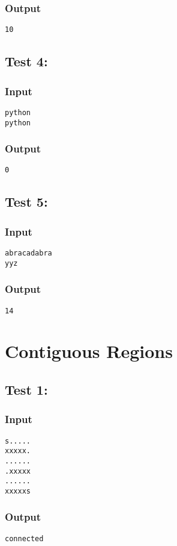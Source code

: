 \documentclass[9pt]{extarticle}
\begin{document}
\begin{multicols}{2}
\subsubsection*{Output}
\texttt{10}

\subsection*{Test 4:}
\subsubsection*{Input}
\texttt{python\\
python}

\subsubsection*{Output}
\texttt{0}

\subsection*{Test 5:}
\subsubsection*{Input}
\texttt{abracadabra\\
yyz}

\subsubsection*{Output}
\texttt{14}

\section{Contiguous Regions}
\subsection*{Test 1:}
\subsubsection*{Input}
\texttt{s.....\\
xxxxx.\\
......\\
.xxxxx\\
......\\
xxxxxs}

\subsubsection*{Output}
\texttt{connected}


\end{multicols}
\end{document}
